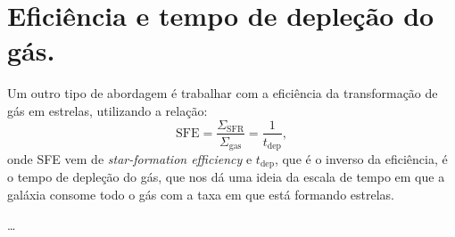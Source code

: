 \section{Eficiência e tempo de depleção do gás.}
\label{sec:gasfrac:SFE}

Um outro tipo de abordagem é trabalhar com a eficiência da transformação de gás em estrelas,
utilizando a relação:
\begin{equation}
	\mathrm{SFE} = \frac{\Sigma_{\mathrm{SFR}}}{\Sigma_{\mathrm{gas}}} = \frac{1}{t_{\mathrm{dep}}},
	\label{eq:SFE}
\end{equation}
\noindent onde SFE vem de {\em star-formation efficiency} e $t_{\mathrm{dep}}$, que é o inverso da
eficiência, é o tempo de depleção do gás, que nos dá uma ideia da escala de tempo em que a galáxia
consome todo o gás com a taxa em que está formando estrelas.

\ldots

